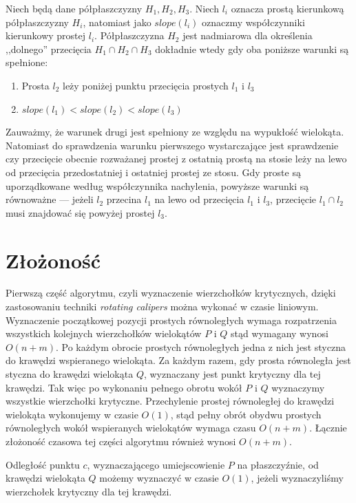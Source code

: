\begin{lemat}[Brown 1978]
  Niech będą dane półpłaszczyzny $H_1, H_2, H_3$. Niech $l_i$ oznacza
  prostą kierunkową półpłaszczyzny $H_i$, natomiast jako $slope(l_i)$
  oznaczmy współczynniki kierunkowy prostej $l_i$. Półpłaszczyzna
  $H_2$ jest nadmiarowa dla określenia ,,dolnego'' przecięcia $H_1
  \cap H_2 \cap H_3$ dokładnie wtedy gdy oba poniższe warunki są
  spełnione:

  \begin{enumerate}
    \item Prosta $l_2$ leży poniżej punktu przecięcia prostych $l_1$ i
      $l_3$
    \item $slope(l_1) < slope(l_2) < slope(l_3)$
  \end{enumerate}
\end{lemat}

Zauważmy, że warunek drugi jest spełniony ze względu na wypukłość
wielokąta. Natomiast do sprawdzenia warunku pierwszego wystarczające
jest sprawdzenie czy przecięcie obecnie rozważanej prostej z ostatnią
prostą na stosie leży na lewo od przecięcia przedostatniej i ostatniej
prostej ze stosu. Gdy proste są uporządkowane według współczynnika
nachylenia, powyższe warunki są równoważne --- jeżeli $l_2$ przecina
$l_1$ na lewo od przecięcia $l_1$ i $l_3$, przecięcie $l_1 \cap l_2$
musi znajdować się powyżej prostej $l_3$.

\section{Złożoność}
Pierwszą część algorytmu, czyli wyznaczenie wierzchołków krytycznych,
dzięki zastosowaniu techniki \emph{rotating calipers} można wykonać w
czasie liniowym. Wyznaczenie początkowej pozycji prostych równoległych
wymaga rozpatrzenia wszystkich kolejnych wierzchołków wielokątów $P$ i
$Q$ stąd wymagany wynosi $O(n + m)$. Po każdym obrocie prostych
równoległych jedna z nich jest styczna do krawędzi wspieranego
wielokąta. Za każdym razem, gdy prosta równoległa jest styczna do
krawędzi wielokąta $Q$, wyznaczany jest punkt krytyczny dla tej
krawędzi. Tak więc po wykonaniu pełnego obrotu wokół $P$ i $Q$
wyznaczymy wszystkie wierzchołki krytyczne. Przechylenie prostej
równoległej do krawędzi wielokąta wykonujemy w czasie $O(1)$, stąd
pełny obrót obydwu prostych równoległych wokół wspieranych wielokątów
wymaga czasu $O(n + m)$.  Łącznie złożoność czasowa tej części
algorytmu również wynosi $O(n + m)$.

Odległość punktu $c$, wyznaczającego umiejscowienie $P$ na
płaszczyźnie, od krawędzi wielokąta $Q$ możemy wyznaczyć w czasie
$O(1)$, jeżeli wyznaczyliśmy wierzchołek krytyczny dla tej krawędzi.

